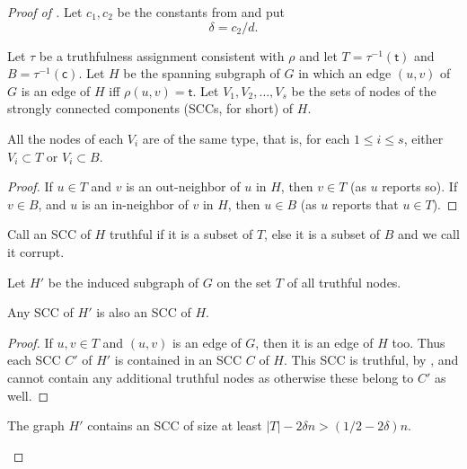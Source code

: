 \documentclass{toc}
\begin{document}
%
\begin{proof}[Proof of ]   %
Let $c_1,c_2$ be the
constants from  and put
\[
\delta = c_2/d.
\]

Let $\tau$ be a truthfulness assignment consistent with $\rho$ and
let $T = \tau^{-1}(\mathsf{t})$ and 
$B = \tau^{-1}(\mathsf{c})$. 
Let $H$ be the spanning  subgraph of $G$ in which an edge $(u,v)$
of $G$ is an edge of $H$ iff $\rho(u,v) = \mathsf{t}$.
%
%
Let $V_1,V_2, \ldots ,V_s$ 
be the sets of nodes of the strongly connected  components 
(SCCs, for short) of $H$. 
\begin{claim}
\label{c25}
All the nodes of each $V_i$ are of the same type, that is, for
each $1 \leq i \leq s$, either $V_i \subset T$ or $V_i \subset B$.
\end{claim}

\begin{proof} If $u \in T$ and $v$ is an out-neighbor of
$u$ in $H$, then 
$v \in T$ (as $u$ reports so). If $v \in B$, and $u$ is an
in-neighbor of $v$ in $H$, then 
$u \in B$ (as $u$ reports that $u \in T$).
\end{proof}

Call  an SCC  
of $H$ truthful if it is a subset of $T$, else it
is a subset of $B$ and we call it corrupt. 

Let $H'$ be the induced subgraph of $G$ on the set $T$ of all truthful 
nodes.
\begin{claim}
\label{c26}
Any SCC of $H'$ is also an SCC
of $H$.
\end{claim}

\begin{proof} If $u,v \in T$  and $(u,v)$ is an edge of $G$, then
it is an edge of $H$ too.
Thus each SCC $C'$ of
$H'$ is contained in an SCC $C$ of $H$.  This SCC is
truthful, by , and cannot contain any additional 
truthful nodes as otherwise these belong to $C'$ as well. 
\end{proof}

\begin{claim}
\label{c27}
The graph $H'$ contains an SCC of size at least
$|T|-2 \delta n > (1/2-2 \delta)n$. 
%
%
\end{claim}


\end{proof}
\end{document}
